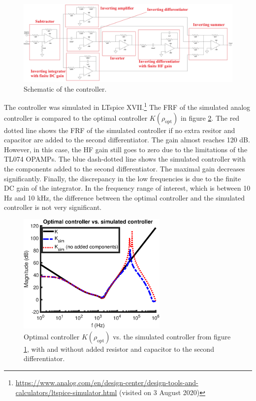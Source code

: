 \begin{figure}[p]
	\centering
    \includegraphics[angle=90,height=\textheight]{figures/circuit_annotated.jpg}
    \caption{Schematic of the controller.}
    \label{fig:controller_schematic}
\end{figure}

The controller was simulated in LTspice XVII.\footnote{\url{https://www.analog.com/en/design-center/design-tools-and-calculators/ltspice-simulator.html} (visited on 3 August 2020)} The FRF of the simulated analog controller is compared to the optimal controller $K(\rho_{\mathrm{opt}})$ in figure \ref{fig:controller_simulation}. The red dotted line shows the FRF of the simulated controller if no extra resitor and capacitor are added to the second differentiator. The gain almost reaches 120 dB. However, in this case, the HF gain still goes to zero due to the limitations of the TL074 OPAMPs. The blue dash-dotted line shows the simulated controller with the components added to the second differentiator. The maximal gain decreases significantly. Finally, the discrepancy in the low frequencies is due to the finite DC gain of the integrator. In the frequency range of interest, which is between 10 Hz and 10 kHz, the difference between the optimal controller and the simulated controller is not very significant.


\begin{figure}[H]
\centering
\includegraphics[width = 0.65\textwidth]{figures/controller_simulation.eps}
\caption{Optimal controller $K(\rho_\mathrm{opt})$ vs. the simulated controller from figure \ref{fig:controller_schematic}, with and without added resistor and capacitor to the second differentiator.}
\label{fig:controller_simulation}
\end{figure}


